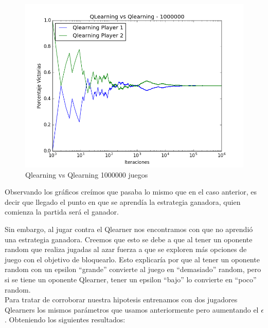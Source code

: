 \begin{figure}[H]
 \centering
 \begin{minipage}{.45\textwidth}
	\centering
	\includegraphics[scale=0.35]{img1/QlearningVsQlearning_1000000_6x5_merge.png}
        \caption{Qlearning vs Qlearning 1000000 juegos}
  \end{minipage}
\end{figure}

Observando los gráficos creímos que pasaba lo mismo que en el caso anterior, es decir que llegado el punto en que se aprendía la estrategia ganadora, quien comienza la partida será el ganador.

Sin embargo, al jugar contra el Qlearner nos encontramos con que no aprendió una estrategia ganadora. Creemos que esto se debe a que al tener un oponente random que realiza jugadas al azar fuerza a que se exploren más opciones de juego con el objetivo de bloquearlo.
Esto explicaría por que al tener un oponente random con un epsilon ``grande'' convierte al juego en ``demasiado'' random, pero si se tiene un oponente Qlearner, tener un epsilon ``bajo'' lo convierte en ``poco'' random. \\

Para tratar de corroborar nuestra hipotesis entrenamos con dos jugadores Qlearners los mismos parámetros que usamos anteriormente pero aumentando el $\epsilon$.
Obteniendo los siguientes resultados:

